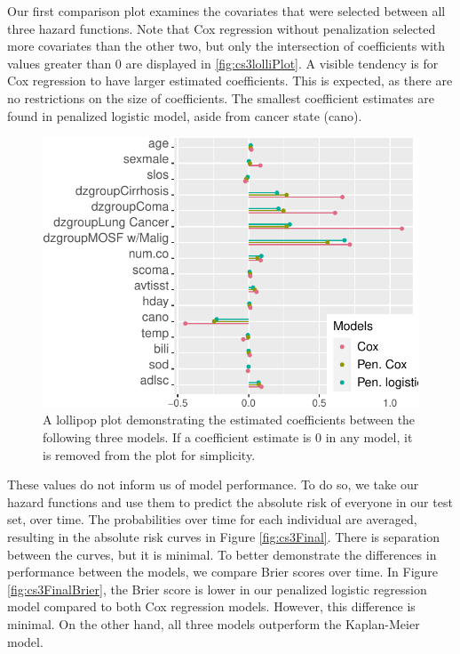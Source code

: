 \documentclass[
]{jss}
\begin{document}
Our first comparison plot examines the covariates that were selected
between all three hazard functions. Note that Cox regression without
penalization selected more covariates than the other two, but only the
intersection of coefficients with values greater than 0 are displayed in
\ref{fig:cs3lolliPlot}. A visible tendency is for Cox regression to have
larger estimated coefficients. This is expected, as there are no
restrictions on the size of coefficients. The smallest coefficient
estimates are found in penalized logistic model, aside from cancer state
(cano).

\begin{CodeChunk}
\begin{figure}

{\centering \includegraphics{../figures/coefplots-1} 

}

\caption{\label{fig:cs3lolliPlot} A lollipop plot demonstrating the estimated coefficients between the following three models. If a coefficient estimate is 0 in any model, it is removed from the plot for simplicity.}\label{fig:coefplots}
\end{figure}
\end{CodeChunk}

These values do not inform us of model performance. To do so, we take
our hazard functions and use them to predict the absolute risk of
everyone in our test set, over time. The probabilities over time for
each individual are averaged, resulting in the absolute risk curves in
Figure \ref{fig:cs3Final}. There is separation between the curves, but
it is minimal. To better demonstrate the differences in performance
between the models, we compare Brier scores over time. In Figure
\ref{fig:cs3FinalBrier}, the Brier score is lower in our penalized
logistic regression model compared to both Cox regression models.
However, this difference is minimal. On the other hand, all three models
outperform the Kaplan-Meier model.
\end{document}
